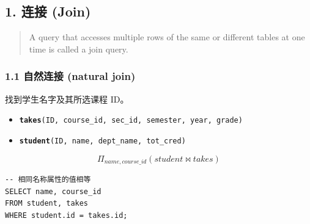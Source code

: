 \documentclass[aspectratio=169, 14pt]{beamer}
\begin{document}
{
\begin{frame}
	\section{\textcolor{darkmidnightblue}{1. 连接 (Join)}}

	\begin{quote}
		A query that accesses multiple rows of the same or different tables at one time is called a \alert{join query}.
	\end{quote}
\end{frame}

}

\begin{frame}[fragile]
	\frametitle{1.1 自然连接 (natural join)}
	找到学生名字及其所选课程 ID。

	\begin{itemize}
		\item \texttt{\textbf{takes}(ID, course\_id, sec\_id, semester, year, grade)}
		\item  \texttt{\textbf{student}(ID, name, dept\_name, tot\_cred)}
	\end{itemize}
	\[\Pi_{name, course\_id}(student \Join takes)\]

	\pause
	\begin{verbatim}
-- 相同名称属性的值相等
SELECT name, course_id
FROM student, takes
WHERE student.id = takes.id;
\end{verbatim}

\end{frame}
\end{document}

